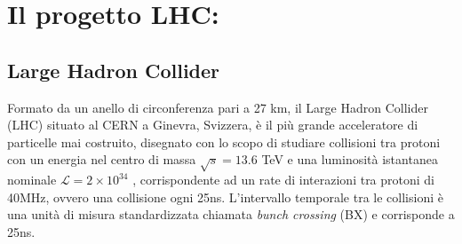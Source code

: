 \chapter{Il progetto LHC:}
\label{cap:PrimoCapitolo}

\sloppy
\section{Large Hadron Collider}
\label{sec:LHC}
Formato da un anello di circonferenza pari a 27 km, il Large Hadron Collider (LHC) situato al CERN a Ginevra, Svizzera, è il più grande acceleratore di particelle mai costruito, disegnato con lo scopo di studiare collisioni tra protoni con un energia nel centro di massa $\sqrt{s} = 13.6$ TeV e una luminosità istantanea nominale $\mathcal{L} = 2 \times 10^{34}$ \Lumi, corrispondente ad un rate di interazioni tra protoni di 40MHz, ovvero una collisione ogni 25ns. L'intervallo temporale tra le collisioni è una unità di misura standardizzata chiamata \textit{bunch crossing} (BX) e corrisponde a 25ns.

